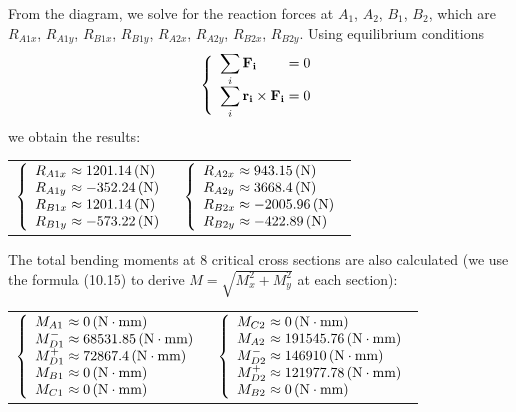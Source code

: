 From the diagram, we solve for the reaction forces at $ A_1 $, $ A_2 $, $ B_1 $, $ B_2 $, which are $ R_{A1x} $, $ R_{A1y} $, $ R_{B1x} $, $ R_{B1y} $, $ R_{A2x} $, $ R_{A2y} $, $ R_{B2x} $, $ R_{B2y} $. Using equilibrium conditions
\[
\left\{ 
\begin{array}{l@{{}={}}l}
\displaystyle\sum_{i} \mathbf{F_{i}} & 0\\
\displaystyle\sum_{i} \mathbf{r_i}\times \mathbf{F_i}& 0\\
\end{array}
\right.
\]
we obtain the results:\vskip2mm
{\centering
	\begin{tabular}[ht]{p{7cm}p{7cm}}
		$
		\left\{ 
		\begin{array}{l@{{} \approx {}}l}
		R_{A1x} & 1201.14\unit{(N)}\\
		R_{A1y} & -352.24\unit{(N)}\\
		R_{B1x} & 1201.14\unit{(N)}\\
		R_{B1y} & -573.22\unit{(N)}\\
		\end{array}
		\right.
		$ & $
		\left\{ 
		\begin{array}{l@{{} \approx {}}l}
		R_{A2x} & 943.15\unit{(N)}\\
		R_{A2y} & 3668.4 \unit{(N)}\\
		R_{B2x} & -2005.96 \unit{(N)}\\
		R_{B2y} & -422.89 \unit{(N)}\\
		\end{array}
		\right.
		$
\end{tabular}}\vskip2mm
The total bending moments at 8 critical cross sections are also calculated (we use the formula (10.15) to derive $M=\sqrt{M_x^2+M_y^2}$ at each section):\vskip2mm
{\centering
	\begin{tabular}[ht]{p{7cm}p{7cm}}
		$
		\left\{ 
		\begin{array}{l@{{} \approx {}}l}
		M_{A1} & 0 \unit{(N\cdot mm)}\\
		M_{D1}^- & 68531.85 \unit{(N\cdot mm)}\\
		M_{D1}^+ & 72867.4 \unit{(N\cdot mm)}\\
		M_{B1} & 0 \unit{(N\cdot mm)}\\
		M_{C1} & 0 \unit{(N\cdot mm)}\\
		\end{array}
		\right.
		$ &
		$
		\left\{ 
		\begin{array}{l@{{} \approx {}}l}
		M_{C2} & 0 \unit{(N\cdot mm)}\\
		M_{A2} & 191545.76 \unit{(N\cdot mm)}\\
		M_{D2}^- & 146910 \unit{(N\cdot mm)}\\
		M_{D2}^+ & 121977.78 \unit{(N\cdot mm)}\\
		M_{B2} & 0 \unit{(N\cdot mm)}\\
		\end{array}
		\right.
		$
\end{tabular}}\vskip2mm

